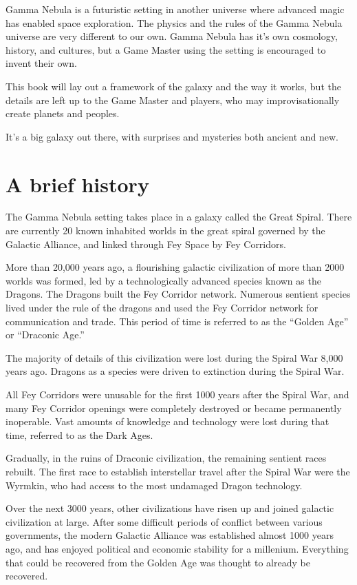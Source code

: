 
Gamma Nebula is a futuristic setting in another universe where advanced magic has enabled space exploration. The physics and the rules of the Gamma Nebula universe are very different to our own. Gamma Nebula has it's own cosmology, history, and cultures, but a Game Master using the setting is encouraged to invent their own.

This book will lay out a framework of the galaxy and the way it works, but the details are left up to the Game Master and players, who may improvisationally create planets and peoples.

It's a big galaxy out there, with surprises and mysteries both ancient and new.

\section{A brief history}

The Gamma Nebula setting takes place in a galaxy called the Great Spiral. There are currently 20 known inhabited worlds in the great spiral governed by the Galactic Alliance, and linked through Fey Space by Fey Corridors.

More than 20,000 years ago, a flourishing galactic civilization of more than 2000 worlds was formed, led by a technologically advanced species known as the Dragons. The Dragons built the Fey Corridor network. Numerous sentient species lived under the rule of the dragons and used the Fey Corridor network for communication and trade. This period of time is referred to as the ``Golden Age'' or ``Draconic Age.''

The majority of details of this civilization were lost during the Spiral War 8,000 years ago. Dragons as a species were driven to extinction during the Spiral War.

All Fey Corridors were unusable for the first 1000 years after the Spiral War, and many Fey Corridor openings were completely destroyed or became permanently inoperable. Vast amounts of knowledge and technology were lost during that time, referred to as the Dark Ages.

Gradually, in the ruins of Draconic civilization, the remaining sentient races rebuilt. The first race to establish interstellar travel after the Spiral War were the Wyrmkin, who had access to the most undamaged Dragon technology.

Over the next 3000 years, other civilizations have risen up and joined galactic civilization at large. After some difficult periods of conflict between various governments, the modern Galactic Alliance was established almost 1000 years ago, and has enjoyed political and economic stability for a millenium. Everything that could be recovered from the Golden Age was thought to already be recovered.

